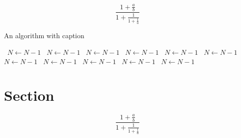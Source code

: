 \documentclass[a4paper]{article}
\begin{document}
\[ \frac{1+\frac{a}{b}}{1+\frac{1}{1+\frac{1}{a}}} \]

\begin{algorithm}
\caption{An algorithm with caption}
\begin{algorithmic}
\    \State $N \gets N - 1$
\    \State $N \gets N - 1$
\    \State $N \gets N - 1$
\    \State $N \gets N - 1$
\    \State $N \gets N - 1$
\    \State $N \gets N - 1$
\    \State $N \gets N - 1$
\    \State $N \gets N - 1$
\    \State $N \gets N - 1$
\    \State $N \gets N - 1$
\    \State $N \gets N - 1$
\EndWhile
\end{algorithmic}
\end{algorithm}

\section{Section}

\[ \frac{1+\frac{a}{b}}{1+\frac{1}{1+\frac{1}{a}}} \]
\end{document}
